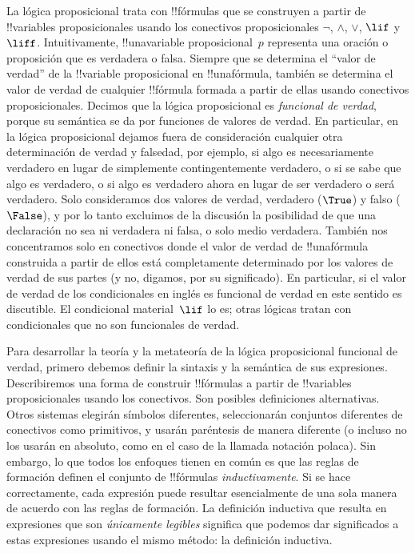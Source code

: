 \documentclass[../../../include/open-logic-section]{subfiles}
\begin{document}


La lógica proposicional trata con !!{fórmulas} que se construyen a partir de !!{variables proposicionales} usando los conectivos proposicionales $\lnot$, $\land$, $\lor$, $\lif$ y $\liff$. Intuitivamente, !!una{variable proposicional}~$p$ representa una oración o proposición que es verdadera o falsa. Siempre que se determina el ``valor de verdad'' de la !!{variable proposicional} en !!una{fórmula}, también se determina el valor de verdad de cualquier !!{fórmula} formada a partir de ellas usando conectivos proposicionales. Decimos que la lógica proposicional es \emph{funcional de verdad}, porque su semántica se da por funciones de valores de verdad. En particular, en la lógica proposicional dejamos fuera de consideración cualquier otra determinación de verdad y falsedad, por ejemplo, si algo es necesariamente verdadero en lugar de simplemente contingentemente verdadero, o si se sabe que algo es verdadero, o si algo es verdadero ahora en lugar de ser verdadero o será verdadero. Solo consideramos dos valores de verdad, verdadero ($\True$) y falso ($\False$), y por lo tanto excluimos de la discusión la posibilidad de que una declaración no sea ni verdadera ni falsa, o solo medio verdadera. También nos concentramos solo en conectivos donde el valor de verdad de !!una{fórmula} construida a partir de ellos está completamente determinado por los valores de verdad de sus partes (y no, digamos, por su significado). En particular, si el valor de verdad de los condicionales en inglés es funcional de verdad en este sentido es discutible. El condicional material~$\lif$ lo es; otras lógicas tratan con condicionales que no son funcionales de verdad.

Para desarrollar la teoría y la metateoría de la lógica proposicional funcional de verdad, primero debemos definir la sintaxis y la semántica de sus expresiones. Describiremos una forma de construir !!{fórmulas} a partir de !!{variables proposicionales} usando los conectivos. Son posibles definiciones alternativas. Otros sistemas elegirán símbolos diferentes, seleccionarán conjuntos diferentes de conectivos como primitivos, y usarán paréntesis de manera diferente (o incluso no los usarán en absoluto, como en el caso de la llamada notación polaca). Sin embargo, lo que todos los enfoques tienen en común es que las reglas de formación definen el conjunto de !!{fórmulas} \emph{inductivamente}. Si se hace correctamente, cada expresión puede resultar esencialmente de una sola manera de acuerdo con las reglas de formación. La definición inductiva que resulta en expresiones que son \emph{únicamente legibles} significa que podemos dar significados a estas expresiones usando el mismo método: la definición inductiva.
\end{document}
